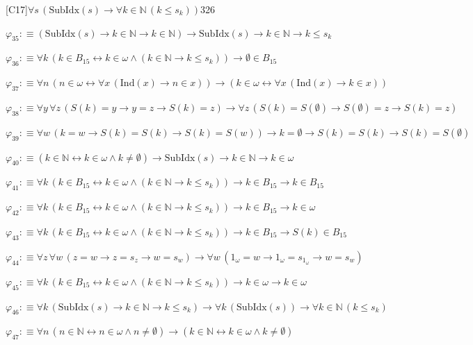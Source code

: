 \begin{fullproof}{[C17]}{$\forall s\,(\mathrm{SubIdx}(s) \to \forall k \in \mathbb{N}\,(k \leq s_{k}))$}{326}
\begin{abbrevlist}
\item $\varphi_{35} :\equiv (\mathrm{SubIdx}(s) \to k \in \mathbb{N} \to k \in \mathbb{N}) \to \mathrm{SubIdx}(s) \to k \in \mathbb{N} \to k \leq s_{k}$
\item $\varphi_{36} :\equiv \forall k\,(k \in B_{15} \leftrightarrow k \in \omega \land (k \in \mathbb{N} \to k \leq s_{k})) \to \emptyset \in B_{15}$
\item $\varphi_{37} :\equiv \forall n\,(n \in \omega \leftrightarrow \forall x\,(\mathrm{Ind}(x) \to n \in x)) \to (k \in \omega \leftrightarrow \forall x\,(\mathrm{Ind}(x) \to k \in x))$
\item $\varphi_{38} :\equiv \forall y\,\forall z\,(S(k) = y \to y = z \to S(k) = z) \to \forall z\,(S(k) = S(\emptyset) \to S(\emptyset) = z \to S(k) = z)$
\item $\varphi_{39} :\equiv \forall w\,(k = w \to S(k) = S(k) \to S(k) = S(w)) \to k = \emptyset \to S(k) = S(k) \to S(k) = S(\emptyset)$
\item $\varphi_{40} :\equiv (k \in \mathbb{N} \leftrightarrow k \in \omega \land k \neq \emptyset) \to \mathrm{SubIdx}(s) \to k \in \mathbb{N} \to k \in \omega$
\item $\varphi_{41} :\equiv \forall k\,(k \in B_{15} \leftrightarrow k \in \omega \land (k \in \mathbb{N} \to k \leq s_{k})) \to k \in B_{15} \to k \in B_{15}$
\item $\varphi_{42} :\equiv \forall k\,(k \in B_{15} \leftrightarrow k \in \omega \land (k \in \mathbb{N} \to k \leq s_{k})) \to k \in B_{15} \to k \in \omega$
\item $\varphi_{43} :\equiv \forall k\,(k \in B_{15} \leftrightarrow k \in \omega \land (k \in \mathbb{N} \to k \leq s_{k})) \to k \in B_{15} \to S(k) \in B_{15}$
\item $\varphi_{44} :\equiv \forall z\,\forall w\,(z = w \to z = s_{z} \to w = s_{w}) \to \forall w\,(1_{\omega} = w \to 1_{\omega} = s_{1_{\omega}} \to w = s_{w})$
\item $\varphi_{45} :\equiv \forall k\,(k \in B_{15} \leftrightarrow k \in \omega \land (k \in \mathbb{N} \to k \leq s_{k})) \to k \in \omega \to k \in \omega$
\item $\varphi_{46} :\equiv \forall k\,(\mathrm{SubIdx}(s) \to k \in \mathbb{N} \to k \leq s_{k}) \to \forall k\,(\mathrm{SubIdx}(s)) \to \forall k \in \mathbb{N}\,(k \leq s_{k})$
\item $\varphi_{47} :\equiv \forall n\,(n \in \mathbb{N} \leftrightarrow n \in \omega \land n \neq \emptyset) \to (k \in \mathbb{N} \leftrightarrow k \in \omega \land k \neq \emptyset)$

\end{abbrevlist}
\end{fullproof}
